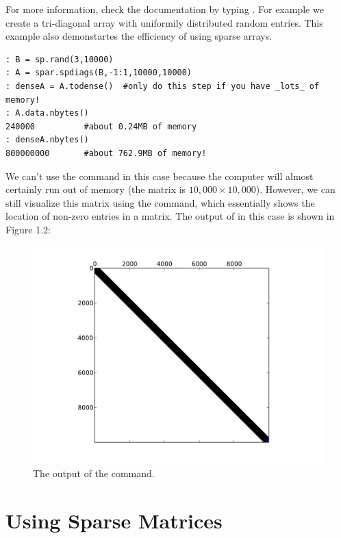 For more information, check the documentation by typing . For example we create a tri-diagonal array with uniformily distributed random entries.  This example also demonstartes the efficiency of using sparse arrays.
\begin{lstlisting}[style=python]
: B = sp.rand(3,10000)
: A = spar.spdiags(B,-1:1,10000,10000)
: denseA = A.todense()  #only do this step if you have _lots_ of memory!
: A.data.nbytes()
240000          #about 0.24MB of memory
: denseA.nbytes()
800000000       #about 762.9MB of memory!
\end{lstlisting}


We can't use the  command in this case because the computer will almost certainly run out of memory (the matrix is $10,\!000 \times 10,\!000$). However, we can still visualize this matrix using the  command, which essentially shows the location of non-zero entries in a matrix. The output of  in this case is shown in Figure 1.2:

\begin{figure}[h!]
\begin{center}
\includegraphics[scale = .5]{./Figures/spy}
\end{center}
\caption{The output of the  command.}
\end{figure}

\section*{Using Sparse Matrices}

